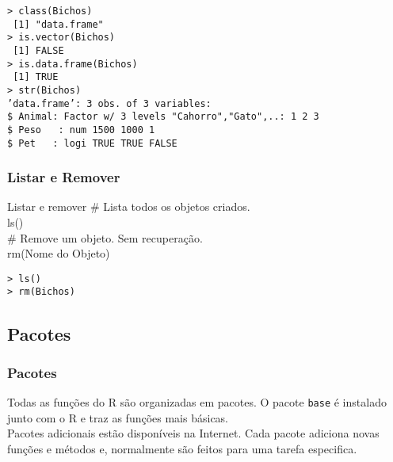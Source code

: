 \documentclass[handout]{beamer}
\begin{document}
  \begin{frame}

\texttt{\small > class(Bichos)\\
~[1] "data.frame"\\
> is.vector(Bichos) \\
~[1] FALSE \\
> is.data.frame(Bichos)\\
~[1] TRUE \\
\vspace{10pt}
> str(Bichos)\\
'data.frame':	3 obs. of  3 variables: \\
\$ Animal: Factor w/ 3 levels "Cahorro","Gato",..: 1 2 3\\
\$ Peso ~ : num  1500 1000 1\\
\$ Pet ~  : logi  TRUE TRUE FALSE}
  \end{frame}
  \begin{frame}
    \frametitle{Listar e Remover}
    \begin{block}{Listar e remover}
     \# Lista todos os objetos criados. \\ 
     ls()\\
      \# Remove um objeto. Sem recuperação. \\
      rm(Nome do Objeto)
    \end{block}
   \texttt{> ls()\\
           > rm(Bichos)
}
  \end{frame}
\subsection{Pacotes}
  \begin{frame}
    \frametitle{Pacotes}
    Todas as funções do R são organizadas em pacotes. O pacote \texttt{base} é instalado junto com o R e traz as funções mais básicas.\\
    \vspace{10pt}
 Pacotes adicionais estão disponíveis na Internet. Cada pacote adiciona novas funções e métodos e, normalmente são feitos para uma tarefa especifica.\\
   
  \end{frame}
\end{document}
